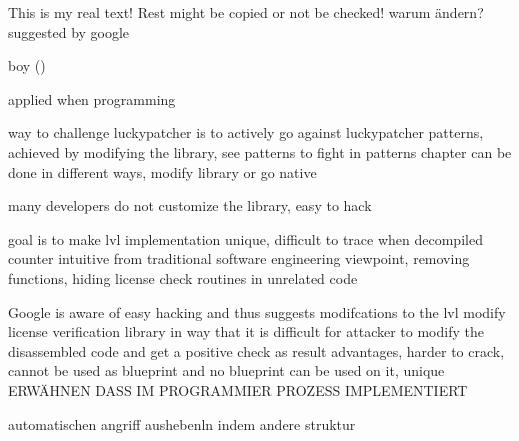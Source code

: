 This is my real text! Rest might be copied or not be checked!
warum ändern?
suggested by google


boy ()

applied when programming

%
way to challenge luckypatcher is to actively go against luckypatcher patterns, achieved by modifying the library, see patterns to fight in patterns chapter
can be done in different ways, modify library or go native

many developers do not customize the library, easy to hack
\cite{munteanLicense}
%

%
goal is to make lvl implementation unique, difficult to trace when decompiled
counter intuitive from traditional software engineering viewpoint, removing functions, hiding license check routines in unrelated code

Google is aware of easy hacking and thus suggests modifcations to the lvl
modify license verification library in way that it is difficult for attacker to modify the disassembled code and get a positive check as result
advantages, harder to crack, cannot be used as blueprint and no blueprint can be used on it, unique
\cite{developersSecuring}
%
ERWÄHNEN DASS IM PROGRAMMIER PROZESS  IMPLEMENTIERT\newline


automatischen angriff aushebenln indem andere struktur
